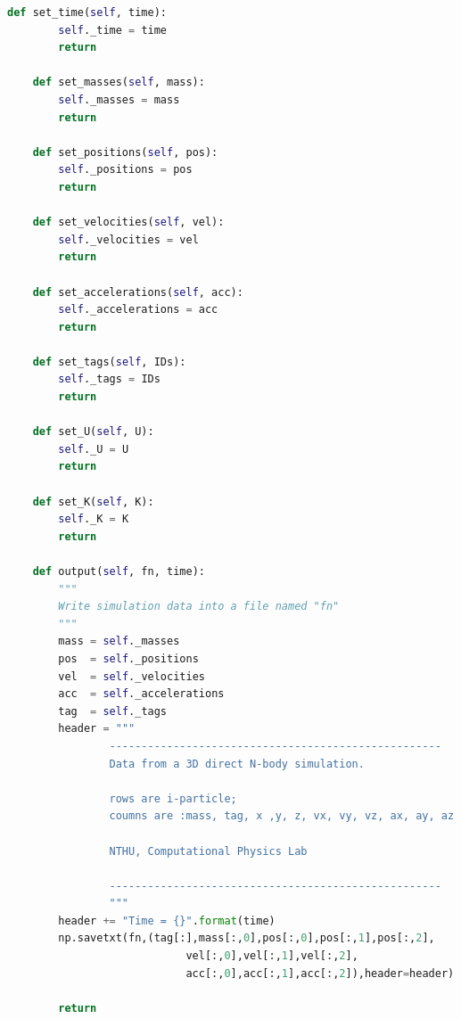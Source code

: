 \documentclass[12pt]{article}
\begin{document}
\begin{lstlisting}[language={Python}]
    def set_time(self, time):
        self._time = time
        return
    
    def set_masses(self, mass):
        self._masses = mass
        return
    
    def set_positions(self, pos):
        self._positions = pos
        return
    
    def set_velocities(self, vel):
        self._velocities = vel
        return
    
    def set_accelerations(self, acc):
        self._accelerations = acc
        return
    
    def set_tags(self, IDs):
        self._tags = IDs
        return
    
    def set_U(self, U):
        self._U = U
        return
    
    def set_K(self, K):
        self._K = K
        return
    
    def output(self, fn, time):
        """
        Write simulation data into a file named "fn"
        """
        mass = self._masses
        pos  = self._positions
        vel  = self._velocities
        acc  = self._accelerations
        tag  = self._tags
        header = """
                ----------------------------------------------------
                Data from a 3D direct N-body simulation. 

                rows are i-particle; 
                coumns are :mass, tag, x ,y, z, vx, vy, vz, ax, ay, az

                NTHU, Computational Physics Lab

                ----------------------------------------------------
                """
        header += "Time = {}".format(time)
        np.savetxt(fn,(tag[:],mass[:,0],pos[:,0],pos[:,1],pos[:,2],
                            vel[:,0],vel[:,1],vel[:,2],
                            acc[:,0],acc[:,1],acc[:,2]),header=header)

        return
      \end{lstlisting}
      
\end{document}
